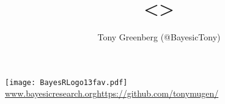 \documentclass{beamer}
\title[<>]{<>}
\author{Tony Greenberg (@BayesicTony)}
\date{}
\begin{document}
\begin{frame}
\titlepage
\vspace{-0.5in}
	\texttt{[image: BayesRLogo13fav.pdf]}\\[1ex]
\small{
\url{www.bayesicresearch.org}\url{https://github.com/tonymugen/}
}
\end{frame}
\end{document}
